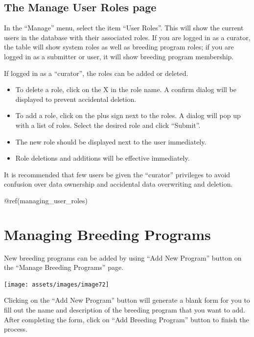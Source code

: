 \documentclass[
  12pt,
]{book}
\providecommand{\tightlist}{%
  \setlength{\itemsep}{0pt}\setlength{\parskip}{0pt}}
\begin{document}
\hypertarget{the-manage-user-roles-page}{%
\section{The Manage User Roles page}\label{the-manage-user-roles-page}}

In the ``Manage'' menu, select the item ``User Roles''. This will show the current users in the database with their associated roles. If you are logged in as a curator, the table will show system roles as well as breeding program roles; if you are logged in as a submitter or user, it will show breeding program membership.

If logged in as a ``curator'', the roles can be added or deleted.

\begin{itemize}
\tightlist
\item
  To delete a role, click on the X in the role name. A confirm dialog will be displayed to prevent accidental deletion.
\item
  To add a role, click on the plus sign next to the roles. A dialog will pop up with a list of roles. Select the desired role and click ``Submit''.
\item
  The new role should be displayed next to the user immediately.
\item
  Role deletions and additions will be effective immediately.
\end{itemize}

It is recommended that few users be given the ``curator'' privileges to avoid confusion over data ownership and accidental data overwriting and deletion.

@ref(managing\_user\_roles)

\hypertarget{managing-breeding-programs}{%
\chapter{Managing Breeding Programs}\label{managing-breeding-programs}}

New breeding programs can be added by using ``Add New Program'' button on the ``Manage Breeding Programs'' page.

\begin{center}\texttt{[image: assets/images/image72]} \end{center}

Clicking on the ``Add New Program'' button will generate a blank form for you to fill out the name and description of the breeding program that you want to add. After completing the form, click on ``Add Breeding Program'' button to finish the process.
\end{document}
